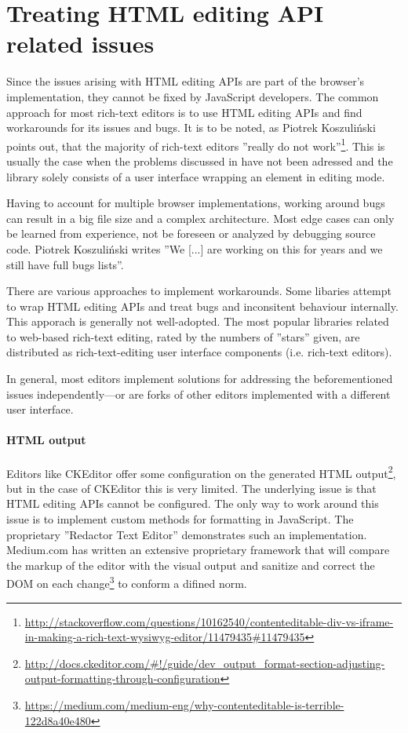 
\section{Treating HTML editing API related issues}
\label{sec:ed_api_treating}

Since the issues arising with HTML editing APIs are part of the browser's implementation, they cannot be fixed by JavaScript developers. The common approach for most rich-text editors is to use HTML editing APIs and find workarounds for its issues and bugs. It is to be noted, as Piotrek Koszuli\'{n}ski points out, that the majority of rich-text editors ''really do not work''\footnote{\url{http://stackoverflow.com/questions/10162540/contenteditable-div-vs-iframe-in-making-a-rich-text-wysiwyg-editor/11479435\#11479435}}. This is usually the case when the problems discussed in  have not been adressed and the library solely consists of a user interface wrapping an element in editing mode.

Having to account for multiple browser implementations, working around bugs can result in a big file size and a complex architecture. Most edge cases can only be learned from experience, not be foreseen or analyzed by debugging source code. Piotrek Koszuli\'{n}ski writes ''We [...] are working on this for years and we still have full bugs lists''\cite{sopp}.

There are various approaches to implement workarounds. Some libaries attempt to wrap HTML editing APIs and treat bugs and inconsitent behaviour internally. This apporach is generally not well-adopted. The most popular libraries related to web-based rich-text editing, rated by the numbers of ''stars'' given, are distributed as rich-text-editing user interface components (i.e. rich-text editors).

In general, most editors implement solutions for addressing the beforementioned issues independently---or are forks of other editors implemented with a different user interface.

\paragraph{HTML output} Editors like CKEditor offer some configuration on the generated HTML output\footnote{\url{http://docs.ckeditor.com/\#!/guide/dev\_output\_format-section-adjusting-output-formatting-through-configuration}}, but in the case of CKEditor this is very limited. The underlying issue is that HTML editing APIs cannot be configured. The only way to work around this issue is to implement custom methods for formatting in JavaScript. The proprietary ''Redactor Text Editor'' demonstrates such an implementation. Medium.com has written an extensive proprietary framework that will compare the markup of the editor with the visual output and sanitize and correct the DOM on each change\footnote{\url{https://medium.com/medium-eng/why-contenteditable-is-terrible-122d8a40e480}} to conform a difined norm.

